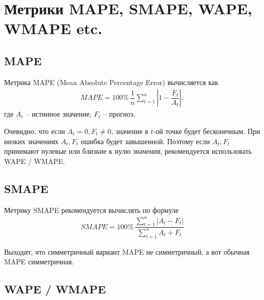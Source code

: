 \documentclass[%
	11pt,
	a4paper,
	utf8,
		]{article}
\begin{document}
\section{Метрики MAPE, SMAPE, WAPE, WMAPE etc.}

\subsection{MAPE}

Метрика MAPE (Mean Absolute Percentage Error) вычисляется как 
\begin{align*}
	MAPE = 100\% \, \dfrac{1}{n} \sum_{t=1}^{n} | 1 - \dfrac{F_t}{A_t} |,
\end{align*}
где $ A_t $ -- истинное значение, $ F_t $ -- прогноз.

Очевидно, что если $ A_t = 0, F_t \neq 0 $, значение в $ t $-ой точке будет бесконечным. При низких значениях $ A_t, F_t $ ошибка будет завышенной. Поэтому если $ A_t, F_t $ принимают нулевые или близкие к нулю значения, рекомендуется использовать WAPE / WMAPE.

\subsection{SMAPE}

Метрику SMAPE рекомендуется вычислять по формуле
\begin{align*}
	SMAPE = 100\% \, \dfrac{ \sum\limits_{t=1}^{n} | A_t - F_t |}{ \sum\limits_{t=1}^n A_t + F_t }
\end{align*}

Выходит, что симметричный вариант MAPE не симметричный, а вот обычная MAPE симметричная.



\subsection{WAPE / WMAPE}
\end{document}
